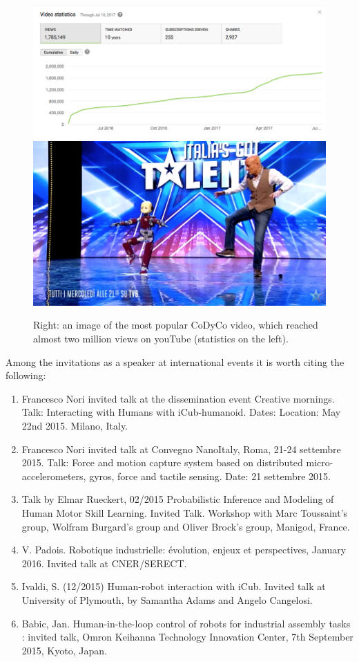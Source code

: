 \documentclass[12pt,a4paper,twoside]{article}
\begin{document}
\begin{figure}
  \centering
    \includegraphics[height=.2\textwidth]{images/icub_igt_stats}
    \hspace{1cm}
    \includegraphics[height=.2\textwidth]{images/icub_igt}
  \caption{Right: an image of the most popular CoDyCo video, which reached
  almost two million views on youTube (statistics on the left).}
\end{figure}

Among the invitations as a speaker at international events it is worth citing the following:

\begin{enumerate}

\item Francesco Nori invited talk at the dissemination event Creative mornings. Talk: Interacting with Humans with iCub-humanoid. Dates: Location: May 22nd 2015. Milano, Italy.

\item Francesco Nori invited talk at Convegno NanoItaly, Roma, 21-24 settembre 2015. Talk: Force and motion capture system
based on distributed micro-accelerometers, gyros, force and tactile sensing. Date: 21 settembre 2015.

\item Talk by Elmar Rueckert, 02/2015 Probabilistic Inference and Modeling of Human Motor Skill Learning. Invited Talk. Workshop with Marc Toussaint’s group, Wolfram Burgard's group and Oliver Brock's group, Manigod, France.

\item  V. Padois. Robotique industrielle: \'evolution, enjeux et perspectives, January 2016. Invited talk at CNER/SERECT.

\item  Ivaldi, S. (12/2015) Human-robot interaction with iCub. Invited talk at University of Plymouth, by Samantha Adams and Angelo Cangelosi.

\item Babic, Jan. Human-in-the-loop control of robots for industrial assembly tasks : invited talk, Omron Keihanna Technology Innovation Center, 7th September 2015, Kyoto, Japan.

\end{enumerate} 
\end{document}

